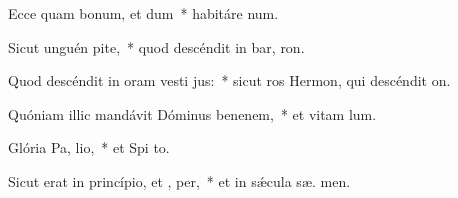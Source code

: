 \item Ecce quam bonum, et  dum~* habitáre   num.
\item Sicut unguén  pite,~* quod descéndit in bar,  ron.
\item Quod descéndit in oram vesti jus:~* sicut ros Hermon, qui descéndit   on.
\item Quóniam illic mandávit Dóminus benenem,~* et vitam   lum.
\item Glória Pa,  lio,~* et Spi to.
\item Sicut erat in princípio, et ,  per,~* et in sǽcula sæ. men.
